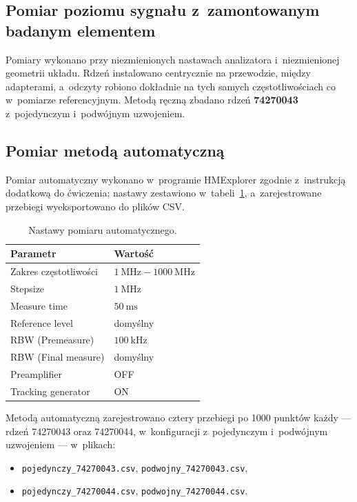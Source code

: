 \documentclass[11pt,a4paper]{article}
\begin{document}
\subsection{Pomiar poziomu sygnału z~zamontowanym badanym elementem}

Pomiary wykonano przy niezmienionych nastawach analizatora i~niezmienionej geometrii
układu. Rdzeń instalowano centrycznie na przewodzie, między adapterami, a~odczyty
robiono dokładnie na tych samych częstotliwościach co w~pomiarze referencyjnym.
Metodą ręczną zbadano rdzeń \textbf{74270043} z~pojedynczym i~podwójnym uzwojeniem.

\subsection{Pomiar metodą automatyczną}

Pomiar automatyczny wykonano w~programie HMExplorer
zgodnie z~instrukcją dodatkową do ćwiczenia; nastawy zestawiono
w~tabeli~\ref{tab:param-auto}, a~zarejestrowane przebiegi wyeksportowano
do plików CSV.

\begin{table}[H]
  \centering
  \caption{Nastawy pomiaru automatycznego.}
  \label{tab:param-auto}
  \renewcommand{\arraystretch}{1.15}
  \begin{tabular}{|l|l|}
    \hline
    \textbf{Parametr} & \textbf{Wartość} \\
    \hline
    Zakres częstotliwości   & $1\ \mathrm{MHz} - 1000\ \mathrm{MHz}$ \\
    \hline
    Stepsize                & $1\ \mathrm{MHz}$ \\
    \hline
    Measure time            & $50\ \mathrm{ms}$ \\
    \hline
    Reference level         & domyślny \\
    \hline
    RBW (Premeasure)        & $100\ \mathrm{kHz}$ \\
    \hline
    RBW (Final measure)     & domyślny \\
    \hline
    Preamplifier            & OFF \\
    \hline
    Tracking generator      & ON \\
    \hline
  \end{tabular}
\end{table}

Metodą automatyczną zarejestrowano cztery przebiegi po 1000 punktów każdy ---
rdzeń 74270043 oraz 74270044, w~konfiguracji z~pojedynczym i~podwójnym uzwojeniem ---
w~plikach:
\begin{itemize}
  \item \texttt{pojedynczy\_74270043.csv}, \texttt{podwojny\_74270043.csv},
  \item \texttt{pojedynczy\_74270044.csv}, \texttt{podwojny\_74270044.csv}.
\end{itemize}
\end{document}
